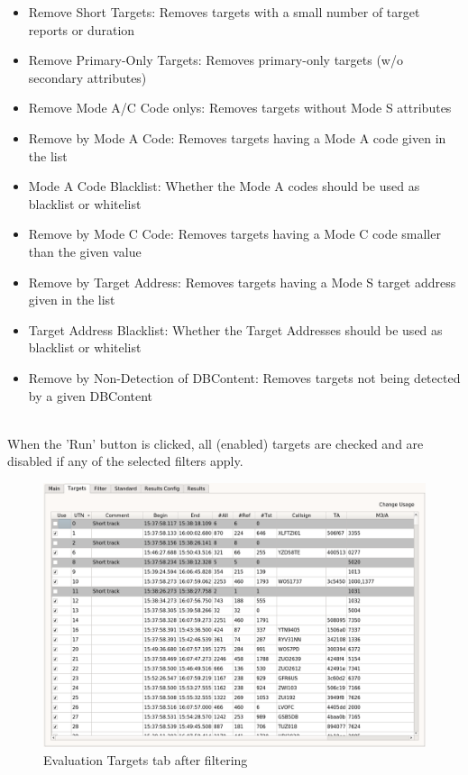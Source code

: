 \begin{itemize}  
\item Remove Short Targets: Removes targets with a small number of target reports or duration
\item Remove Primary-Only Targets: Removes primary-only targets (w/o secondary attributes)
\item Remove Mode A/C Code onlys: Removes targets without Mode S attributes
\item Remove by Mode A Code: Removes targets having a Mode A code given in the list
\item Mode A Code Blacklist: Whether the Mode A codes should be used as blacklist or whitelist
\item Remove by Mode C Code: Removes targets having a Mode C code smaller than the given value
\item Remove by Target Address: Removes targets having a Mode S target address given in the list
\item Target Address Blacklist: Whether the Target Addresses should be used as blacklist or whitelist
\item Remove by Non-Detection of DBContent: Removes targets not being detected by a given DBContent
\end{itemize}
\ \\

When the 'Run' button is clicked, all (enabled) targets are checked and are disabled if any of the selected filters apply.

\begin{figure}[H]
  \hspace*{-2cm}
    \includegraphics[width=18cm,frame]{figures/eval_targets_filtered.png}
  \caption{Evaluation Targets tab after filtering}
\end{figure}

